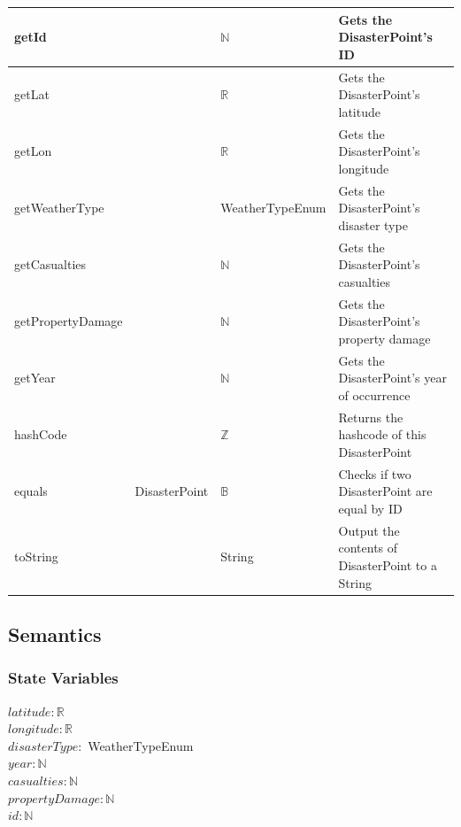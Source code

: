 \documentclass[12pt]{article}
\begin{document}
\begin{tabular}{| l | l | l | p{5cm} |}
                    getId & ~ & $\mathbb{N}$ & Gets the DisasterPoint's ID\\
                    \hline
                    getLat & ~ & $\mathbb{R}$ & Gets the DisasterPoint's latitude\\
                    \hline
                    getLon & ~ & $\mathbb{R}$ & Gets the DisasterPoint's longitude\\
                    \hline
                    getWeatherType & ~ & WeatherTypeEnum & Gets the DisasterPoint's disaster type\\
                    \hline
                    getCasualties & ~ & $\mathbb{N}$ & Gets the DisasterPoint's casualties\\
                    \hline
                    getPropertyDamage & ~ & $\mathbb{N}$ & Gets the DisasterPoint's property damage\\
                    \hline
                    getYear & ~ & $\mathbb{N}$ & Gets the DisasterPoint's year of occurrence\\
                    \hline
                    hashCode & ~ & $\mathbb{Z}$ & Returns the hashcode of this DisasterPoint\\
                    \hline
                    equals & DisasterPoint & $\mathbb{B}$ & Checks if two DisasterPoint are equal by ID \\
                    \hline
                    toString & ~ & String & Output the contents of DisasterPoint to a String\\
                    \hline
                    \end{tabular}
                
                \subsection* {Semantics}
                
                \subsubsection* {State Variables}
                    $latitude: \mathbb{R}$\\
                    $longitude: \mathbb{R}$\\
                    $disasterType:$ WeatherTypeEnum\\
                    $year: \mathbb{N}$\\
                    $casualties: \mathbb{N}$\\
                    $propertyDamage: \mathbb{N}$\\
                    $id: \mathbb{N}$\\
                
\end{document}
